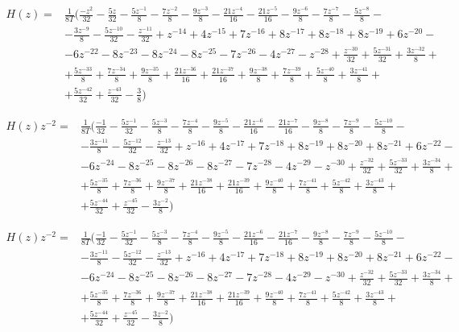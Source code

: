 \documentclass[12pt]{article}
\numberwithin{equation}{section}
\numberwithin{figure}{section}
\numberwithin{table}{section}
\begin{document}
\begin{equation}
\begin{split}
H(z) = & \frac{1}{8T}(\frac{-z^2}{32}-\frac{5z}{32}-\frac{5z^{-1}}{8}-\frac{7z^{-2}}{8}-\frac{9z^{-3}}{8}-\frac{21z^{-4}}{16}-\frac{21z^{-5}}{16}-\frac{9z^{-6}}{8}-\frac{7z^{-7}}{8}-\frac{5z^{-8}}{8}-\\
&-\frac{3z^{-9}}{8}-\frac{5z^{-10}}{32}-\frac{z^{-11}}{32}+z^{-14}+4z^{-15}+7z^{-16}+8z^{-17}+8z^{-18}+8z^{-19}+6z^{-20}-\\
&-6z^{-22}-8z^{-23}-8z^{-24}-8z^{-25}-7z^{-26}-4z^{-27}-z^{-28}+\frac{z^{-30}}{32}+\frac{5z^{-31}}{32}+\frac{3z^{-32}}{8}+\\
&+\frac{5z^{-33}}{8}+\frac{7z^{-34}}{8}+\frac{9z^{-35}}{8}+\frac{21z^{-36}}{16}+\frac{21z^{-37}}{16}+\frac{9z^{-38}}{8}+\frac{7z^{-39}}{8}+\frac{5z^{-40}}{8}+\frac{3z^{-41}}{8}+\\
&+\frac{5z^{-42}}{32}+\frac{z^{-43}}{32}-\frac{3}{8})
\end{split}
\end{equation}

\begin{equation}
\begin{split}
H(z) z^{-2}= & \frac{1}{8T}(\frac{-1}{32}-\frac{5z^{-1}}{32}-\frac{5z^{-3}}{8}-\frac{7z^{-4}}{8}-\frac{9z^{-5}}{8}-\frac{21z^{-6}}{16}-\frac{21z^{-7}}{16}-\frac{9z^{-8}}{8}-\frac{7z^{-9}}{8}-\frac{5z^{-10}}{8}-\\
&-\frac{3z^{-11}}{8}-\frac{5z^{-12}}{32}-\frac{z^{-13}}{32}+z^{-16}+4z^{-17}+7z^{-18}+8z^{-19}+8z^{-20}+8z^{-21}+6z^{-22}-\\
&-6z^{-24}-8z^{-25}-8z^{-26}-8z^{-27}-7z^{-28}-4z^{-29}-z^{-30}+\frac{z^{-32}}{32}+\frac{5z^{-33}}{32}+\frac{3z^{-34}}{8}+\\
&+\frac{5z^{-35}}{8}+\frac{7z^{-36}}{8}+\frac{9z^{-37}}{8}+\frac{21z^{-38}}{16}+\frac{21z^{-39}}{16}+\frac{9z^{-40}}{8}+\frac{7z^{-41}}{8}+\frac{5z^{-42}}{8}+\frac{3z^{-43}}{8}+\\
&+\frac{5z^{-44}}{32}+\frac{z^{-45}}{32}-\frac{3z^{-2}}{8})
\end{split}
\end{equation}

\begin{equation}
\begin{split}
H(z) z^{-2}= & \frac{1}{8T}(\frac{-1}{32}-\frac{5z^{-1}}{32}-\frac{5z^{-3}}{8}-\frac{7z^{-4}}{8}-\frac{9z^{-5}}{8}-\frac{21z^{-6}}{16}-\frac{21z^{-7}}{16}-\frac{9z^{-8}}{8}-\frac{7z^{-9}}{8}-\frac{5z^{-10}}{8}-\\
&-\frac{3z^{-11}}{8}-\frac{5z^{-12}}{32}-\frac{z^{-13}}{32}+z^{-16}+4z^{-17}+7z^{-18}+8z^{-19}+8z^{-20}+8z^{-21}+6z^{-22}-\\
&-6z^{-24}-8z^{-25}-8z^{-26}-8z^{-27}-7z^{-28}-4z^{-29}-z^{-30}+\frac{z^{-32}}{32}+\frac{5z^{-33}}{32}+\frac{3z^{-34}}{8}+\\
&+\frac{5z^{-35}}{8}+\frac{7z^{-36}}{8}+\frac{9z^{-37}}{8}+\frac{21z^{-38}}{16}+\frac{21z^{-39}}{16}+\frac{9z^{-40}}{8}+\frac{7z^{-41}}{8}+\frac{5z^{-42}}{8}+\frac{3z^{-43}}{8}+\\
&+\frac{5z^{-44}}{32}+\frac{z^{-45}}{32}-\frac{3z^{-2}}{8})
\end{split}
\end{equation}
\end{document}
